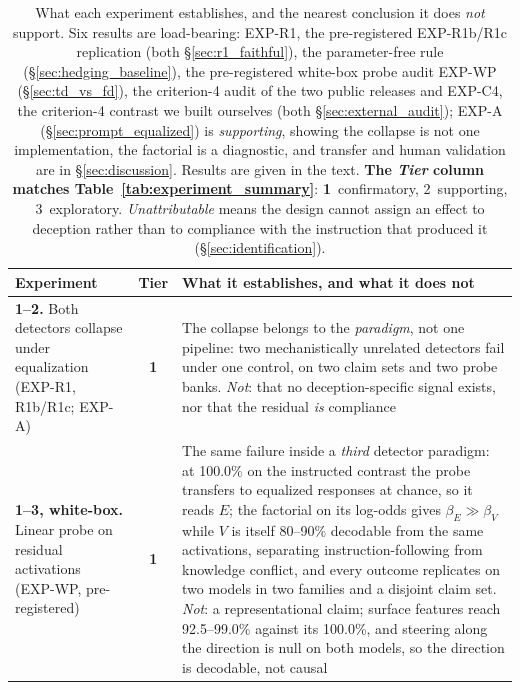 \begin{table}[h]
\centering
\caption{What each experiment establishes, and the nearest conclusion it does \emph{not} support. Six results are load-bearing: EXP-R1, the pre-registered EXP-R1b/R1c replication (both §\ref{sec:r1_faithful}), the parameter-free rule (§\ref{sec:hedging_baseline}), the pre-registered white-box probe audit EXP-WP (§\ref{sec:td_vs_fd}), the criterion-4 audit of the two public releases and EXP-C4, the criterion-4 contrast we built ourselves (both §\ref{sec:external_audit}); EXP-A (§\ref{sec:prompt_equalized}) is \emph{supporting}, showing the collapse is not one implementation, the factorial is a diagnostic, and transfer and human validation are in §\ref{sec:discussion}. Results are given in the text. \textbf{The \emph{Tier} column matches Table~\ref{tab:experiment_summary}}: \textbf{1}~confirmatory, 2~supporting, 3~exploratory. \emph{Unattributable} means the design cannot assign an effect to deception rather than to compliance with the instruction that produced it (§\ref{sec:identification}).}
\label{tab:what_establishes}
\begin{scriptsize}
\setlength{\tabcolsep}{4pt}
\begin{tabular}{@{}p{1.35in}cp{3.70in}@{}}
\toprule
\textbf{Experiment} & \textbf{Tier} & \textbf{What it establishes, and what it does not} \\
\midrule
\textbf{1--2.} Both detectors collapse under equalization (EXP-R1, R1b/R1c; EXP-A) & \textbf{1} & The collapse belongs to the \emph{paradigm}, not one pipeline: two mechanistically unrelated detectors fail under one control, on two claim sets and two probe banks. \emph{Not}: that no deception-specific signal exists, nor that the residual \emph{is} compliance \\
\addlinespace[1pt]
\textbf{1--3, white-box.} Linear probe on residual activations (EXP-WP, pre-registered) & \textbf{1} & The same failure inside a \emph{third} detector paradigm: at 100.0\% on the instructed contrast the probe transfers to equalized responses at chance, so it reads $E$; the factorial on its log-odds gives $\beta_E\!\gg\!\beta_V$ while $V$ is itself 80--90\% decodable from the same activations, separating instruction-following from knowledge conflict, and every outcome replicates on two models in two families and a disjoint claim set. \emph{Not}: a representational claim; surface features reach 92.5--99.0\% against its 100.0\%, and steering along the direction is null on both models, so the direction is decodable, not causal \\

\end{tabular}
\end{scriptsize}
\end{table}
